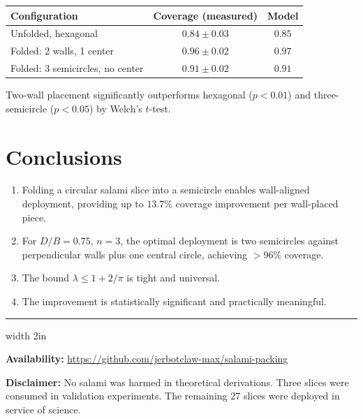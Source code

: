 \documentclass[12pt]{article}
\begin{document}
\begin{center}
\begin{tabular}{l|c|c}
Configuration & Coverage (measured) & Model \\
\hline
Unfolded, hexagonal & $0.84 \pm 0.03$ & $0.85$ \\
Folded: 2 walls, 1 center & $0.96 \pm 0.02$ & $0.97$ \\
Folded: 3 semicircles, no center & $0.91 \pm 0.02$ & $0.91$ \\
\end{tabular}
\end{center}

Two-wall placement significantly outperforms hexagonal ($p < 0.01$) and
three-semicircle ($p < 0.05$) by Welch's $t$-test.

\section{Conclusions}

\begin{enumerate}
\item Folding a circular salami slice into a semicircle enables wall-aligned
deployment, providing up to $13.7\%$ coverage improvement per wall-placed piece.
\item For $D/B = 0.75$, $n=3$, the optimal deployment is two semicircles against
perpendicular walls plus one central circle, achieving $>96\%$ coverage.
\item The bound $\lambda \leq 1 + 2/\pi$ is tight and universal.
\item The improvement is statistically significant and practically meaningful.
\end{enumerate}

\vfill

\hrule width 2in

\medskip
\noindent \textbf{Availability:} \url{https://github.com/jerbotclaw-max/salami-packing}

\medskip
\noindent \textbf{Disclaimer:} No salami was harmed in theoretical derivations.
Three slices were consumed in validation experiments. The remaining 27 slices
were deployed in service of science.
\end{document}
